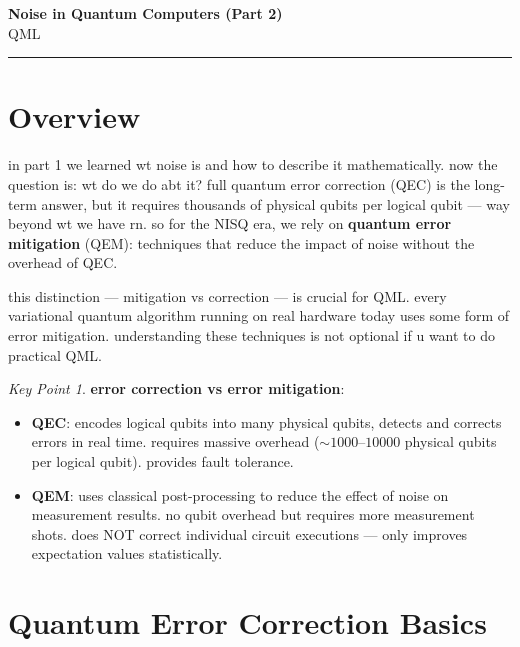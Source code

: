 \documentclass[11pt,a4paper]{article}
\theoremstyle{definition}
\theoremstyle{remark}
\newtheorem*{keypoint}{Key Point}
\begin{document}
\begin{center}
    {\LARGE \textbf{Noise in Quantum Computers (Part 2)}}\\[8pt]
    {\large QML}\\[12pt]
    \hrule
\end{center}

\vspace{12pt}
\tableofcontents
\newpage

\section{Overview}

in part 1 we learned wt noise is and how to describe it mathematically. now the question is: wt do we do abt it? full quantum error correction (QEC) is the long-term answer, but it requires thousands of physical qubits per logical qubit --- way beyond wt we have rn. so for the NISQ era, we rely on \textbf{quantum error mitigation} (QEM): techniques that reduce the impact of noise without the overhead of QEC.

this distinction --- mitigation vs correction --- is crucial for QML. every variational quantum algorithm running on real hardware today uses some form of error mitigation. understanding these techniques is not optional if u want to do practical QML.

\begin{keypoint}
\textbf{error correction vs error mitigation}:
\begin{itemize}
    \item \textbf{QEC}: encodes logical qubits into many physical qubits, detects and corrects errors in real time. requires massive overhead ($\sim 1000$--$10000$ physical qubits per logical qubit). provides fault tolerance.
    \item \textbf{QEM}: uses classical post-processing to reduce the effect of noise on measurement results. no qubit overhead but requires more measurement shots. does NOT correct individual circuit executions --- only improves expectation values statistically.
\end{itemize}
\end{keypoint}

\section{Quantum Error Correction Basics}
\end{document}
